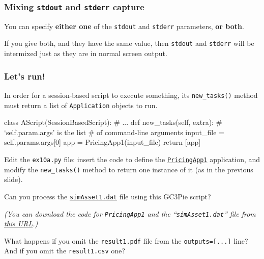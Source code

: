 \documentclass[english,serif,mathserif,xcolor=pdftex,dvipsnames,table]{beamer}
\begin{document}
\begin{frame}
  \frametitle{Mixing \texttt{stdout} and \texttt{stderr} capture}

  You can specify \textbf{either one} of the \texttt{stdout} and
  \texttt{stderr} parameters, \textbf{or both}.

  \+
  If you give both, and they have the same value, then
  \texttt{stdout} and \texttt{stderr} will be intermixed just as they
  are in normal screen output.
\end{frame}


\begin{frame}[fragile]
  \frametitle{Let's run!}
  In order for a session-based script to execute something, its
  \texttt{new\_tasks()} method must return a list of
  \texttt{Application} objects to run.

\+
\begin{python}
class AScript(SessionBasedScript):
  # ...
  def new_tasks(self, extra):
    # `self.param.args' is the list
    # of command-line arguments
    input_file = self.params.args[0]
    app = PricingApp1(input_file)
    return [app]
\end{python}
\end{frame}


\begin{frame}[fragile]
  \small

  \begin{exercise*}[10.B]

    \+
    Edit the \texttt{ex10a.py} file: insert the code to define the
    \href{https://raw.githubusercontent.com/riccardomurri/python-for-science-intro/master/downloads/pricingapp1.py}{\texttt{PricingApp1}}
    application, and modify the \texttt{new\_tasks()} method to return
    one instance of it (as in the previous slide).

    \+
    Can you process the \href{https://raw.githubusercontent.com/riccardomurri/python-for-science-intro/master/fig/simAsset1.dat}{\texttt{simAsset1.dat}} file using this GC3Pie script?

    \+ \footnotesize
    {\em (You can download the code for \texttt{PricingApp1} and the ``\texttt{simAsset1.dat}'' file from
   \href{https://raw.githubusercontent.com/riccardomurri/python-for-science-intro/master/download/}{this
      URL}.)}
  \end{exercise*}

  \+
  \begin{exercise*}[10.C]
    What happens if you omit the \texttt{result1.pdf} file from the
    \texttt{outputs=[...]} line?  And if you omit the \texttt{result1.csv} one?
  \end{exercise*}
\end{frame}
\end{document}
